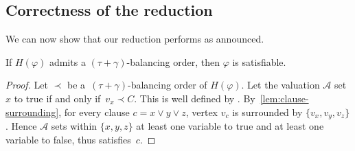 \documentclass[a4paper,UKenglish,cleveref,hyperref,autoref]{lipics-v2021}
\begin{document}
\subsection{Correctness of the reduction}

We can now show that our reduction performs as announced.

\begin{lemma}\label{lem:bo-to-sat}
If $H(\varphi)$ admits a $(\tau + \gamma)$-balancing order, then $\varphi$ is satisfiable.
\end{lemma}
\begin{proof}
  Let $\prec$ be a~$(\tau + \gamma)$-balancing order of $H(\varphi)$.
  Let the valuation $\mathcal A$ set $x$ to true if and only if~$v_x \prec C$.
  This is well defined by .
  By~\cref{lem:clause-surrounding}, for every clause $c = x \lor y \lor z$, vertex $v_c$ is surrounded by $\{v_x, v_y, v_z\}$.
  Hence $\mathcal A$ sets within $\{x, y, z\}$ at least one variable to true and at least one variable to false, thus satisfies~$c$.
\end{proof}
\end{document}
